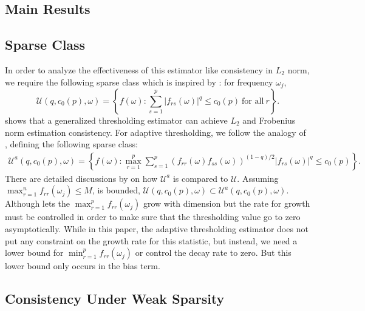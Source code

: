 \subsection{Main Results}
\subsection{Sparse Class}
In order to analyze the effectiveness of this estimator like consistency in $L_2$ norm, we require the following sparse class which is inspired by \cite{bickel2008covariance}: for frequency $\omega_j$, 
\begin{equation}
\mathcal{U}(q, c_0(p), \omega) = \left\{f(\omega): \sum_{s=1}^p |f_{rs}(\omega)|^q \le c_0(p) ~\text{for all}~ r\right \}. 
\end{equation}
\cite{sun2018large} shows that a generalized thresholding estimator can achieve $L_2$ and Frobenius norm estimation consistency. For adaptive thresholding, we follow the analogy of \cite{cai2011adaptive}, defining the following sparse class:
\begin{equation}
\begin{aligned}
\label{eq:sparse_class}
\mathcal{U}^a(q, c_0(p), \omega) = \left\{f(\omega): \max_{r=1}^p\sum_{s=1}^p (f_{rr}(\omega)f_{ss}(\omega))^{(1-q)/2} |f_{rs}(\omega)|^q \le c_0(p)\right \}.  
\end{aligned}
\end{equation}
There are detailed discussions by \cite{cai2011adaptive}
on how $\mathcal{U}^a$ is compared to $\mathcal{U}$. Assuming $\max_{r=1}^n f_{rr}(\omega_j)\le M$, is bounded, 
$\mathcal{U}(q, c_0(p), \omega) \subset \mathcal{U}^a(q, c_0(p), \omega) $. Although \cite{sun2018large} lets the $\max_{r=1}^p f_{rr}(\omega_j)$ grow with dimension but the rate for growth must be controlled in order to make sure that the thresholding value go to zero asymptotically. While in this paper,  the adaptive thresholding estimator does not put any constraint on the growth rate for this statistic, but instead, we need a lower bound for $\min_{r=1}^p f_{rr}(\omega_j)$ or control the decay rate to zero. But this lower bound only occurs in the bias term. 

\subsection{Consistency Under Weak Sparsity}

